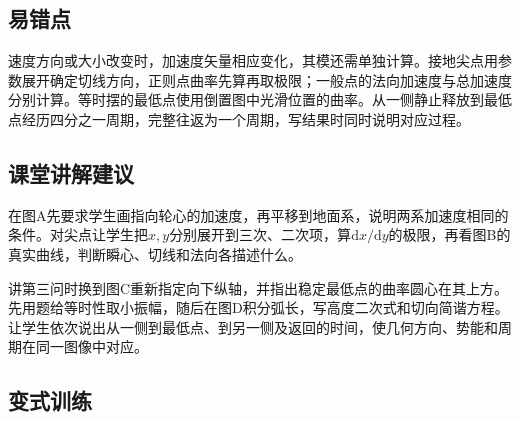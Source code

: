 \documentclass[UTF8,fontset=fandol,a4paper,11pt]{ctexart}
\begin{document}


\subsection*{易错点}

速度方向或大小改变时，加速度矢量相应变化，其模还需单独计算。接地尖点用参数展开确定切线方向，正则点曲率先算再取极限；一般点的法向加速度与总加速度分别计算。等时摆的最低点使用倒置图中光滑位置的曲率。从一侧静止释放到最低点经历四分之一周期，完整往返为一个周期，写结果时同时说明对应过程。



\subsection*{课堂讲解建议}

在图A先要求学生画指向轮心的加速度，再平移到地面系，说明两系加速度相同的条件。对尖点让学生把$x,y$分别展开到三次、二次项，算$\mathrm dx/\mathrm dy$的极限，再看图B的真实曲线，判断瞬心、切线和法向各描述什么。

讲第三问时换到图C重新指定向下纵轴，并指出稳定最低点的曲率圆心在其上方。先用题给等时性取小振幅，随后在图D积分弧长，写高度二次式和切向简谐方程。让学生依次说出从一侧到最低点、到另一侧及返回的时间，使几何方向、势能和周期在同一图像中对应。



\subsection*{变式训练}
\end{document}
